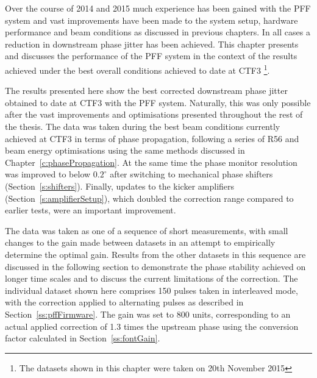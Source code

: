 
Over the course of 2014 and 2015 much experience has been gained with the PFF system and vast improvements have been made to the system setup, hardware performance and beam conditions as discussed in previous chapters. In all cases a reduction in downstream phase jitter has been achieved. This chapter presents and discusses the performance of the PFF system in the context of the results achieved under the best overall conditions achieved to date at CTF3 \footnote{The datasets shown in this chapter were taken on 20th November 2015}.




The results presented here show the best corrected downstream phase jitter obtained to date at CTF3 with the PFF system. Naturally, this was only possible after the vast improvements and optimisations presented throughout the rest of the thesis. The data was taken during the best beam conditions currently achieved at CTF3 in terms of phase propagation, following a series of R56 and beam energy optimisations using the same methods discussed in Chapter~\ref{c:phasePropagation}. %
At the same time the phase monitor resolution was improved to below \(0.2^\circ\) after switching to mechanical phase shifters (Section~\ref{s:shifters}). Finally, updates to the kicker amplifiers (Section~\ref{s:amplifierSetup}), which doubled the correction range compared to earlier tests, were an important improvement.

The data was taken as one of a sequence of short measurements, with small changes to the gain made between datasets in an attempt to empirically determine the optimal gain. Results from the other datasets in this sequence are discussed in the following section to demonstrate the phase stability achieved on longer time scales and to discuss the current limitations of the correction. The individual dataset shown here comprises 150 pulses taken in interleaved mode, with the correction applied to alternating pulses as described in Section~\ref{ss:pffFirmware}. The gain was set to 800 units, corresponding to an actual applied correction of 1.3 times the upstream phase using the conversion factor calculated in Section~\ref{ss:fontGain}.

